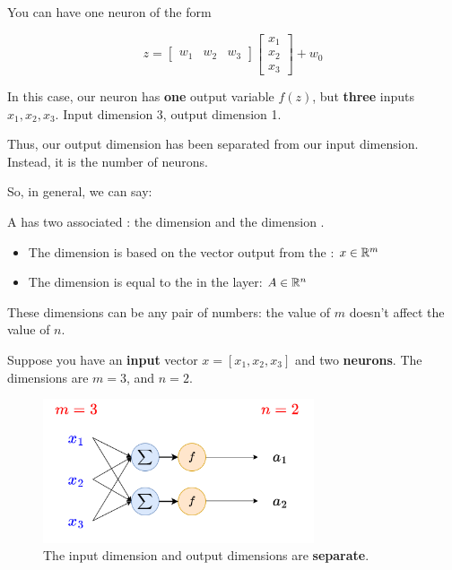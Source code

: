         \miniex You can have one neuron of the form
        
        \begin{equation*}
            z = 
            \begin{bmatrix}
                w_1 & w_2 & w_3
            \end{bmatrix}
            \begin{bmatrix}
                x_1\\x_2\\x_3
            \end{bmatrix}
            +
            w_0
        \end{equation*}
        
        In this case, our neuron has \textbf{one} output variable $f(z)$, but \textbf{three} inputs $x_1,x_2,x_3$. Input dimension 3, output dimension 1.
        
        Thus, our output dimension has been separated from our input dimension. Instead, it is the number of neurons.
        
        So, in general, we can say:\\
        
        \begin{notation}
            A  has two associated : the  dimension  and the  dimension .
            
            \begin{itemize}
                \item The  dimension  is based on the vector output from the : $x \in \mathbb R^m$
                
                \item The  dimension  is equal to the  in the  layer: $A \in \mathbb R^n$
            \end{itemize}

            These dimensions can be any pair of numbers: the value of $m$ doesn't affect the value of $n$.
        \end{notation}
        
        \miniex Suppose you have an \textbf{input} vector $x=[x_1, x_2, x_3]$ and two \textbf{neurons}. The dimensions are $m=3$, and $n=2$.
    
        \begin{figure}[H]
            \centering
            \includegraphics[width=80mm,scale=0.4]{images/nn_images/dimensions_network.png}
            \caption*{The input dimension and output dimensions are \textbf{separate}.}
        \end{figure}
        
